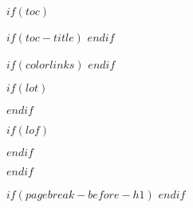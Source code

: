$if(toc)$

$if(toc-title)$
\renewcommand*\contentsname{$toc-title$}
$endif$

\pagestyle{plain}



$if(colorlinks)$
\hypersetup{linkcolor=$if(toccolor)$$toccolor$$else$$endif$}
$endif$

\setcounter{tocdepth}{$toc-depth$}

\tableofcontents

$if(lot)$
  \listoftables
$endif$

$if(lof)$
  \listoffigures
  \newpage
$endif$

\clearpage
$endif$

\pagestyle{fancy}
\fancyhead{} %
\fancyhead[L]{\fontsize{11}{12} \selectfont \color{gray} \nouppercase{\leftmark}} %

$if(pagebreak-before-h1)$
\let\oldsection\section
\renewcommand\section{\clearpage\oldsection}
$endif$
